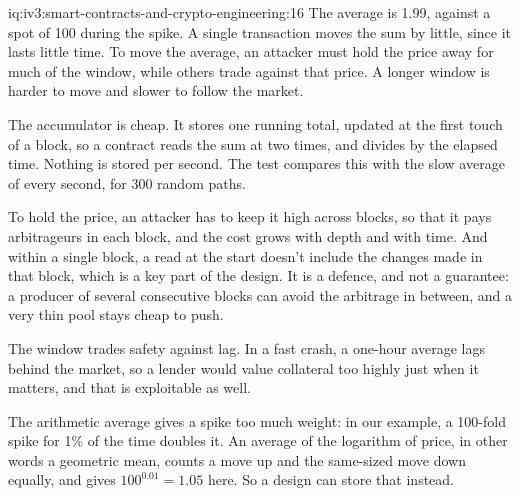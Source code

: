 \begin{solution}{iq:iv3:smart-contracts-and-crypto-engineering:16}
The average is 1.99, against a spot of 100 during the spike. A single transaction moves the sum by little, since it lasts little time. To move the average, an attacker must hold the price away for much of the window, while others trade against that price. A longer window is harder to move and slower to follow the market.
\label{lst:iv3:cr:twap}

The accumulator is cheap. It stores one running total, updated at the first touch of a block, so a contract reads the sum at two times, and divides by the elapsed time. Nothing is stored per second. The test compares this with the slow average of every second, for 300 random paths.

To hold the price, an attacker has to keep it high across blocks, so that it pays arbitrageurs in each block, and the cost grows with depth and with time. And within a single block, a read at the start doesn't include the changes made in that block, which is a key part of the design. It is a defence, and not a guarantee: a producer of several consecutive blocks can avoid the arbitrage in between, and a very thin pool stays cheap to push.

The window trades safety against lag. In a fast crash, a one-hour average lags behind the market, so a lender would value collateral too highly just when it matters, and that is exploitable as well.

The arithmetic average gives a spike too much weight: in our example, a 100-fold spike for 1\% of the time doubles it. An average of the logarithm of price, in other words a geometric mean, counts a move up and the same-sized move down equally, and gives $100^{0.01} = 1.05$ here. So a design can store that instead.

\end{solution}

